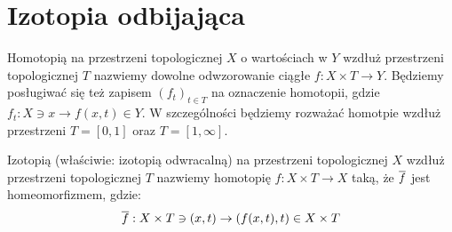 \section{Izotopia odbijająca}

\begin{df}
  Homotopią na przestrzeni topologicznej $X$ o wartościach w $Y$ wzdłuż przestrzeni topologicznej $T$ nazwiemy dowolne odwzorowanie ciągłe $f: X \times T \rightarrow Y$. Będziemy posługiwać się też zapisem $(f_t)_{t \in T}$ na oznaczenie homotopii, gdzie $f_t: X \ni x \rightarrow f(x,t) \in Y$. W szczególności będziemy rozważać homotpie wzdłuż przestrzeni $T = [0,1]$ oraz $T = [1, \infty]$.
\end{df}


\begin{df}
  Izotopią (właściwie: izotopią odwracalną) na przestrzeni topologicznej $X$ wzdłuż przestrzeni topologicznej $T$ nazwiemy homotopię $f: X \times T \rightarrow X$ taką, że $\overline{f}$ jest homeomorfizmem, gdzie:
  \[\overline{f}: X \times T \ni (x, t) \rightarrow (f(x, t), t) \in X \times T\]
\end{df}

